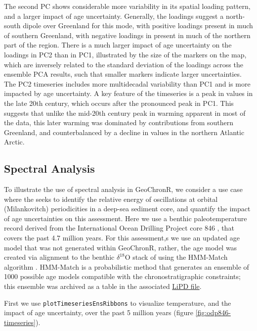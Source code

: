 \documentclass[gchron, manuscript]{copernicus}
\begin{document}
The second PC shows considerable more variability in its spatial loading pattern, and a larger impact of age uncertainty.
Generally, the loadings suggest a north-south dipole over Greenland for this mode, with positive loadings present in much of southern Greenland, with negative loadings in present in much of the northern part of the region.
There is a much larger impact of age uncertainty on the loadings in PC2 than in PC1, illustrated by the size of the markers on the map, which are inversely related to the standard deviation of the loadings across the ensemble PCA results, such that smaller markers indicate larger uncertainties.
The PC2 timeseries includes more multidecadal variability than PC1 and is more impacted by age uncertainty.
A key feature of the timeseries is a peak in values in the late 20th century, which occurs after the pronounced peak in PC1.
This suggests that unlike the mid-20th century peak in warming apparent in most of the data, this later warming was dominated by contributions from southern Greenland, and counterbalanced by a decline in values in the northern Atlantic Arctic.

\hypertarget{sec:spec_vignette}{%
\subsection{Spectral Analysis}\label{sec:spec_vignette}}

To illustrate the use of spectral analysis in GeoChronR, we consider a use case where the seeks to identify the relative energy of oscillations at orbital (Milankovitch) periodicities in a deep-sea sediment core, and quantify the impact of age uncertainties on this assessment.
Here we use a benthic paleotemperature record derived from the International Ocean Drilling Project core 846 \citep{mix1995benthic, Shackleton95}, that covers the past 4.7 million years.
For this assessment,s we use an updated age model that was not generated within GeoChronR, rather, the age model was created via alignment to the benthic \(\delta^{18}\mathrm{O}\) stack of \citet{LisieckiRaymo05} using the HMM-Match algorithm \citep{ProbStack, Khider_2017}.
HMM-Match is a probabilistic method that generates an ensemble of 1000 possible age models compatible with the chronostratigraphic constraints; this ensemble was archived as a table in the associated \href{http://lipdverse.org/geoChronR-examples/ODP846.Lawrence.2006.lpd}{LiPD file}.

First we use \texttt{plotTimeseriesEnsRibbons} to visualize temperature, and the impact of age uncertainty, over the past 5 million years (figure \ref{fig:odp846-timeseries}).
\end{document}
